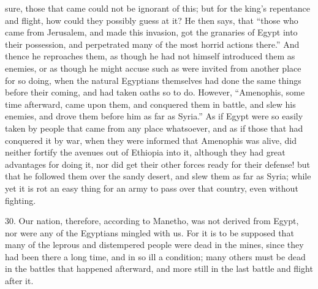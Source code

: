 sure, those that came could not be ignorant of this; but for the king's
repentance and flight, how could they possibly guess at it? He then says,
that ``those who came from Jerusalem, and made this invasion, got the
granaries of Egypt into their possession, and perpetrated many of the most
horrid actions there.'' And thence he reproaches them, as though he had not
himself introduced them as enemies, or as though he might accuse such as
were invited from another place for so doing, when the natural Egyptians
themselves had done the same things before their coming, and had taken
oaths so to do. However, ``Amenophis, some time afterward, came upon them,
and conquered them in battle, and slew his enemies, and drove them before
him as far as Syria.'' As if Egypt were so easily taken by people that came
from any place whatsoever, and as if those that had conquered it by war,
when they were informed that Amenophis was alive, did neither fortify the
avenues out of Ethiopia into it, although they had great advantages for
doing it, nor did get their other forces ready for their defense! but that
he followed them over the sandy desert, and slew them as far as Syria;
while yet it is rot an easy thing for an army to pass over that country,
even without fighting.

30. Our nation, therefore, according to Manetho, was not derived from
Egypt, nor were any of the Egyptians mingled with us. For it is to be
supposed that many of the leprous and distempered people were dead in the
mines, since they had been there a long time, and in so ill a condition;
many others must be dead in the battles that happened afterward, and more
still in the last battle and flight after it.


